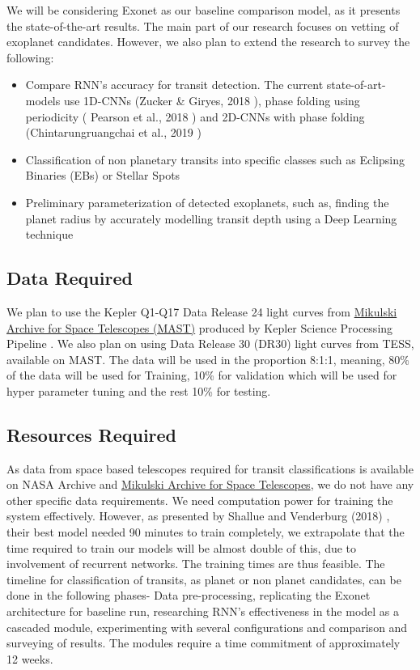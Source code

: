 We will be considering Exonet \cite{exonet} as our baseline comparison model, as it presents the state-of-the-art results. The main part of our research focuses on vetting of exoplanet candidates. However, we also plan to extend the research to survey the following:
\begin{itemize}
    \item Compare RNN's accuracy for transit detection. The current state-of-art-models use 1D-CNNs (Zucker & Giryes, 2018 \cite{zucker}), phase folding using periodicity ( Pearson et al., 2018 \cite{pearson}) and 2D-CNNs with phase folding (Chintarungruangchai et al., 2019 \cite{2dcnn})
    \item Classification of non planetary transits into specific classes such as Eclipsing Binaries (EBs) or Stellar Spots
    \item Preliminary parameterization of detected exoplanets, such as, finding the planet radius by accurately modelling transit depth using a Deep Learning technique
\end{itemize}

\subsection{Data Required}
We plan to use the Kepler Q1-Q17 Data Release 24 light curves from \href{https://mast.stsci.edu/portal/Mashup/Clients/Mast/Portal.html}{Mikulski Archive for Space Telescopes (MAST)} produced by Kepler Science Processing Pipeline \cite{spp}. We also plan on using Data Release 30 (DR30) light curves from TESS, available on MAST. The data will be used in the proportion 8:1:1, meaning, 80\% of the data will be used for Training, 10\% for validation which will be used for hyper parameter tuning and the rest 10\% for testing. 
\subsection{Resources Required}
As data from space based telescopes required for transit classifications is available on NASA Archive and \href{https://mast.stsci.edu/portal/Mashup/Clients/Mast/Portal.html}{Mikulski Archive for Space Telescopes}, we do not have any other specific data requirements. We need computation power for training the system effectively. However, as presented by Shallue and Venderburg (2018) \cite{astronet}, their best model needed 90 minutes to train completely, we extrapolate that the time required to train our models will be almost double of this, due to involvement of recurrent networks. The training times are thus feasible. The timeline for classification of transits, as planet or non planet candidates, can be done in the following phases- Data pre-processing, replicating the Exonet architecture for baseline run, researching RNN's effectiveness in the model as a cascaded module, experimenting with several configurations and comparison and surveying of results. The modules require a time commitment of approximately 12 weeks.